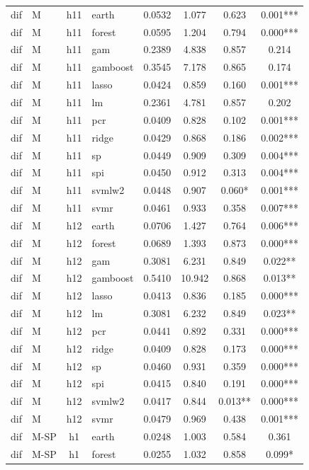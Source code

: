 \begin{ThreePartTable}
\begin{longtable}[t]{llclcccc}
\addlinespace
dif & M & h11 & earth & 0.0532 & 1.077 & 0.623 & 0.001***\\
dif & M & h11 & forest & 0.0595 & 1.204 & 0.794 & 0.000***\\
dif & M & h11 & gam & 0.2389 & 4.838 & 0.857 & 0.214\\
dif & M & h11 & gamboost & 0.3545 & 7.178 & 0.865 & 0.174\\
dif & M & h11 & lasso & 0.0424 & 0.859 & 0.160 & 0.001***\\
dif & M & h11 & lm & 0.2361 & 4.781 & 0.857 & 0.202\\
dif & M & h11 & pcr & 0.0409 & 0.828 & 0.102 & 0.001***\\
dif & M & h11 & ridge & 0.0429 & 0.868 & 0.186 & 0.002***\\
dif & M & h11 & sp & 0.0449 & 0.909 & 0.309 & 0.004***\\
dif & M & h11 & spi & 0.0450 & 0.912 & 0.313 & 0.004***\\
dif & M & h11 & svmlw2 & 0.0448 & 0.907 & 0.060* & 0.001***\\
dif & M & h11 & svmr & 0.0461 & 0.933 & 0.358 & 0.007***\\
\addlinespace
dif & M & h12 & earth & 0.0706 & 1.427 & 0.764 & 0.006***\\
dif & M & h12 & forest & 0.0689 & 1.393 & 0.873 & 0.000***\\
dif & M & h12 & gam & 0.3081 & 6.231 & 0.849 & 0.022**\\
dif & M & h12 & gamboost & 0.5410 & 10.942 & 0.868 & 0.013**\\
dif & M & h12 & lasso & 0.0413 & 0.836 & 0.185 & 0.000***\\
dif & M & h12 & lm & 0.3081 & 6.232 & 0.849 & 0.023**\\
dif & M & h12 & pcr & 0.0441 & 0.892 & 0.331 & 0.000***\\
dif & M & h12 & ridge & 0.0409 & 0.828 & 0.173 & 0.000***\\
dif & M & h12 & sp & 0.0460 & 0.931 & 0.359 & 0.000***\\
dif & M & h12 & spi & 0.0415 & 0.840 & 0.191 & 0.000***\\
dif & M & h12 & svmlw2 & 0.0417 & 0.844 & 0.013** & 0.000***\\
dif & M & h12 & svmr & 0.0479 & 0.969 & 0.438 & 0.001***\\
\addlinespace
dif & M-SP & h1 & earth & 0.0248 & 1.003 & 0.584 & 0.361\\
dif & M-SP & h1 & forest & 0.0255 & 1.032 & 0.858 & 0.099*\\

\end{longtable}
\end{ThreePartTable}
